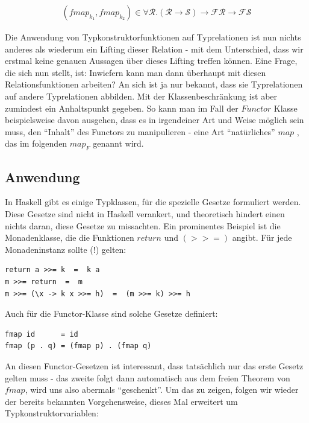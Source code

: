 \begin{align*}
(fmap_{k_1}, fmap_{k_2}) \in \forall \mathcal{R} . (\mathcal{R} \rightarrow \mathcal{S}) \rightarrow \mathcal{F} \mathcal{R}
\rightarrow \mathcal{F} \mathcal{S}
\end{align*}

Die Anwendung von Typkonstruktorfunktionen auf Typrelationen ist nun nichts anderes als wiederum ein Lifting dieser
Relation - mit dem Unterschied, dass wir erstmal keine genauen Aussagen über dieses Lifting treffen können.
Eine Frage, die sich nun stellt, ist: Inwiefern kann man dann überhaupt mit diesen Relationsfunktionen arbeiten? An sich ist ja nur
bekannt, dass sie Typrelationen auf andere Typrelationen abbilden. Mit der Klassenbeschränkung ist aber zumindest ein
Anhaltspunkt gegeben. So kann man im Fall der $Functor$ Klasse beispielsweise davon ausgehen, dass es in irgendeiner
Art und Weise möglich sein muss, den ``Inhalt'' des Functors zu manipulieren - eine Art ``natürliches'' $map$ 
, das im folgenden $map_F$ genannt wird.


\subsection{Anwendung}

In Haskell gibt es einige Typklassen, für die spezielle Gesetze formuliert werden. Diese Gesetze sind nicht in Haskell
verankert, und theoretisch hindert einen nichts daran, diese Gesetze zu missachten. Ein prominentes Beispiel ist die
Monadenklasse, die die Funktionen $return$ und $(>>=)$ angibt. Für jede Monadeninstanz sollte (!) gelten:

\begin{verbatim}
return a >>= k  =  k a
m >>= return  =  m
m >>= (\x -> k x >>= h)  =  (m >>= k) >>= h
\end{verbatim}

Auch für die Functor-Klasse sind solche Gesetze definiert:

\begin{verbatim}
fmap id      = id
fmap (p . q) = (fmap p) . (fmap q)
\end{verbatim}

An diesen Functor-Gesetzen ist interessant, dass tatsächlich nur das erste Gesetz gelten muss - das zweite folgt dann automatisch
aus dem freien Theorem von $fmap$, wird uns also abermals ``geschenkt''. Um das zu zeigen, folgen wir wieder der bereits bekannten Vorgehensweise, dieses Mal erweitert um Typkonstruktorvariablen:

